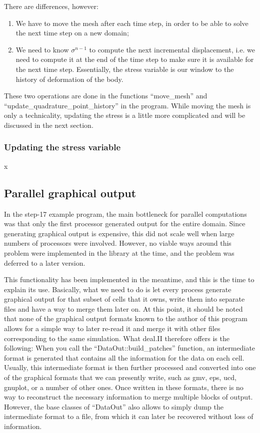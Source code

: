 \documentclass{article}
\begin{document}
There are differences, however:
\begin{enumerate}
  \item We have to move the mesh after each time step, in order to be
  able to solve the next time step on a new domain;

  \item We need to know $\sigma^{n-1}$ to compute the next incremental
  displacement, i.e. we need to compute it at the end of the time step
  to make sure it is available for the next time step. Essentially,
  the stress variable is our window to the history of deformation of
  the body.
\end{enumerate}
These two operations are done in the functions ``move\_mesh'' and
``update\_\-quadrature\_\-point\_history'' in the program. While moving
the mesh is only a technicality, updating the stress is a little more
complicated and will be discussed in the next section.


\subsubsection*{Updating the stress variable}
x

\subsection*{Parallel graphical output}

In the step-17 example program, the main bottleneck for parallel computations
was that only the first processor generated output for the entire domain.
Since generating graphical output is expensive, this did not scale well when
large numbers of processors were involved. However, no viable ways around this
problem were implemented in the library at the time, and the problem was
deferred to a later version.

This functionality has been implemented in the meantime, and this is the time
to explain its use. Basically, what we need to do is let every process
generate graphical output for that subset of cells that it owns, write them
into separate files and have a way to merge them later on. At this point, it
should be noted that none of the graphical output formats known to the author
of this program allows for a simple way to later re-read it and merge it with
other files corresponding to the same simulation. What deal.II therefore
offers is the following: When you call the ``DataOut::build\_patches''
function, an intermediate format is generated that contains all the
information for the data on each cell. Usually, this intermediate format is
then further processed and converted into one of the graphical formats that we
can presently write, such as gmv, eps, ucd, gnuplot, or a number of other
ones. Once written in these formats, there is no way to reconstruct the
necessary information to merge multiple blocks of output. However, the base
classes of ``DataOut'' also allows to simply dump the intermediate format to a
file, from which it can later be recovered without loss of information.
\end{document}

